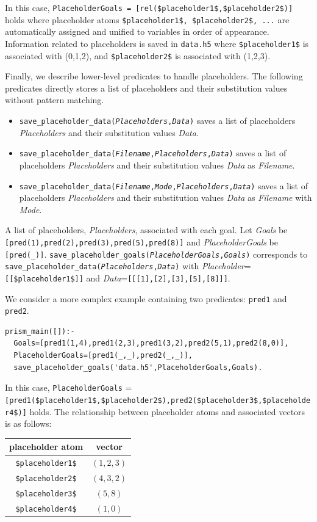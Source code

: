 \documentclass[a4paper]{report}
\begin{document}
In this case, \verb|PlaceholderGoals = [rel($placeholder1$,$placeholder2$)]| holds where placeholder atoms \verb|$placeholder1$, $placeholder2$, ...| are automatically assigned and unified to variables in order of appearance.
Information related to placeholders is saved in {\tt data.h5} where
\verb|$placeholder1$| is associated with (0,1,2), and \verb|$placeholder2$| is associated with (1,2,3).

Finally, we describe lower-level predicates to handle placeholders.
The following predicates directly stores a list of placeholders and their substitution values without pattern matching.
\begin{itemize}
	\item {\tt save\_placeholder\_data({\it Placeholders},{\it Data})}
	saves a list of placeholders {\it Placeholders} and their substitution values {\it Data}.
	\item {\tt save\_placeholder\_data({\it Filename},{\it Placeholders},{\it Data})} saves a list of placeholders {\it Placeholders} and their substitution values {\it Data} as {\it Filename}.
	\item {\tt save\_placeholder\_data({\it Filename},{\it Mode},{\it Placeholders},{\it Data})} saves a list of placeholders {\it Placeholders} and their substitution values {\it Data} as {\it Filename} with {\it Mode}.
\end{itemize}

A list of placeholders, {\it Placeholders}, associated with each goal.
Let {\it Goals} be \verb|[pred(1),pred(2),pred(3),pred(5),pred(8)]|
and {\it PlaceholderGoals} be \verb|[pred(_)]|.
{\tt save\_placeholder\_goals({\it PlaceholderGoals},{\it Goals})}
 corresponds to {\tt save\_placeholder\_data({\it Placeholders},{\it Data})} with
{\it Placeholder}={\tt [[\$placeholder1\$]]} and {\it Data}={\tt [[[1],[2],[3],[5],[8]]]}.

We consider a more complex example containing two predicates: {\tt pred1} and {\tt pred2}.
\begin{verbatim}
prism_main([]):-
  Goals=[pred1(1,4),pred1(2,3),pred1(3,2),pred2(5,1),pred2(8,0)],
  PlaceholderGoals=[pred1(_,_),pred2(_,_)],
  save_placeholder_goals('data.h5',PlaceholderGoals,Goals).
\end{verbatim}
In this case, \verb|PlaceholderGoals| = \verb|[pred1($placeholder1$,$placeholder2$),pred2($placeholder3$,$placeholder4$)]| holds.
The relationship between placeholder atoms and associated vectors is as follows:

\begin{tabular}{|c|c|}
	\hline 
	placeholder atom& vector \\ 
	\hline 
	\verb|$placeholder1$|& $(1,2,3)$ \\ 
	\hline 
	\verb|$placeholder2$|& $(4,3,2)$ \\ 
	\hline 
	\verb|$placeholder3$|& $(5,8)$ \\ 
	\hline 
	\verb|$placeholder4$|& $(1,0)$ \\ 
	\hline 
\end{tabular} 
\end{document}
